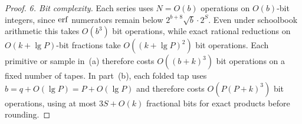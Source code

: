 \begin{proof}
\emph{6. Bit complexity.}
Each series uses $N=O(b)$ operations on $O(b)$-bit integers, since $\operatorname{erf}$ numerators remain below $2^{b+8}\sqrt{b}\cdot 2^S$. Even under schoolbook arithmetic this takes $O(b^3)$ bit operations, while exact rational reductions on $O(k+\lg P)$-bit fractions take $O((k+\lg P)^2)$ bit operations. Each primitive or sample in~(a) therefore costs $O((b+k)^3)$ bit operations on a fixed number of tapes. In part~(b), each folded tap uses $b=q+O(\lg P)=P+O(\lg P)$ and therefore costs $O(P(P+k)^3)$ bit operations, using at most $3S+O(k)$ fractional bits for exact products before rounding.
\end{proof}
